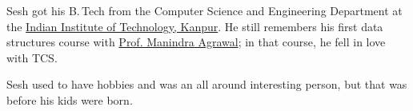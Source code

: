 \documentclass{toc}
\begin{document}
\begin{tocaboutauthors}
\begin{tocabout}[seshadhri]
\noindent
Sesh got his B.\,Tech from the Computer Science and Engineering Department at
the \href{https://www.cse.iitk.ac.in/}{Indian Institute of Technology,
Kanpur}.  He still remembers his first data structures course with
\href{https://sites.google.com/view/manindra/home}{Prof. Manindra
Agrawal}; in that course, he fell in love with TCS.

\noindent
Sesh used to have hobbies and was an all around interesting person,
but that was before his kids were born.
\end{tocabout}
\end{tocaboutauthors}
\end{document}
